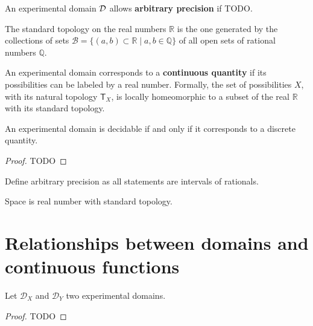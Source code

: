 \documentclass[11pt,letterpaper,fleqn]{memoir} %
\begin{document}
\begin{mathSection}
	
	\begin{defn}
		An experimental domain $\mathcal{D}$ allows \textbf{arbitrary precision} if TODO.
	\end{defn}
	
	\begin{defn}
		The standard topology on the real numbers $\mathbb{R}$ is the one generated by the collections of sets $\mathcal{B} = \{ (a,b) \subset \mathbb{R} \; | \; a,b \in \mathbb{Q} \}$ of all open sets of rational numbers $\mathbb{Q}$.
	\end{defn}
	
	\begin{defn}
		An experimental domain corresponds to a \textbf{continuous quantity} if its possibilities can be labeled by a real number. Formally, the set of possibilities $X$, with its natural topology $\mathsf{T}_X$, is locally homeomorphic to a subset of the real $\mathbb{R}$ with its standard topology.
	\end{defn}
	
	\begin{prop}
		An experimental domain is decidable if and only if it corresponds to a discrete quantity.
	\end{prop}
	
	\begin{proof}
		TODO
	\end{proof}	
\end{mathSection}


Define arbitrary precision as all statements are intervals of rationals.

Space is real number with standard topology.

\section{Relationships between domains and continuous functions}


\begin{mathSection}
	\begin{defn}
		Let $\mathcal{D}_X$ and $\mathcal{D}_Y$ two experimental domains.
	\end{defn}
	\begin{prop}
		
	\end{prop}
	\begin{proof}
		TODO
	\end{proof}
\end{mathSection}
\end{document}
